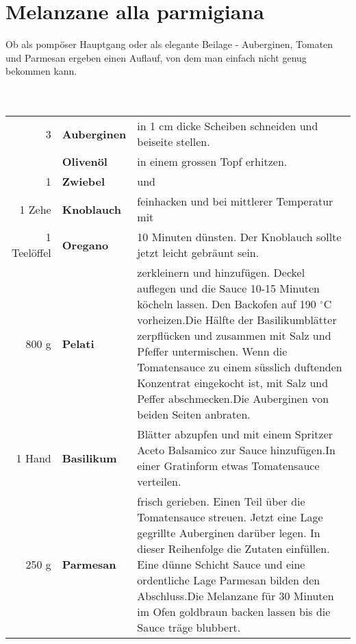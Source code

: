 

\section{Melanzane alla parmigiana}
Ob als pompöser Hauptgang oder als elegante Beilage - Auberginen, Tomaten und Parmesan ergeben einen Auflauf, von dem man einfach nicht genug bekommen kann.
\\
\\
\\
\begin{tabularx}{\linewidth}{r>{\bfseries\textbf}lX}
	3 & Auberginen & in 1 cm dicke Scheiben schneiden und beiseite stellen.\\
	& Olivenöl & in einem grossen Topf erhitzen.\\
	1 & Zwiebel & und\\
	1 Zehe & Knoblauch & feinhacken und bei mittlerer Temperatur mit\\
	1 Teelöffel & Oregano & 10 Minuten dünsten. Der Knoblauch sollte jetzt leicht gebräunt sein.\\
	800 g & Pelati & zerkleinern und hinzufügen. Deckel auflegen und die Sauce 10-15 Minuten köcheln lassen. Den Backofen auf 190 $^{\circ}$C vorheizen.\newline \newline Die Hälfte der Basilikumblätter zerpflücken und zusammen mit Salz und Pfeffer untermischen. Wenn die Tomatensauce zu einem süsslich duftenden Konzentrat eingekocht ist, mit Salz und Peffer abschmecken.\newline \newline Die Auberginen von beiden Seiten anbraten.\\
	1 Hand & Basilikum & Blätter abzupfen und mit einem Spritzer Aceto Balsamico zur Sauce hinzufügen.\newline \newline In einer Gratinform etwas Tomatensauce verteilen.\\
	250 g & Parmesan & frisch gerieben. Einen Teil über die Tomatensauce streuen. Jetzt eine Lage gegrillte Auberginen darüber legen. In dieser Reihenfolge die Zutaten einfüllen. Eine dünne Schicht Sauce und eine ordentliche Lage Parmesan bilden den Abschluss.\newline \newline Die Melanzane für 30 Minuten im Ofen goldbraun backen lassen bis die Sauce träge blubbert.\\
\end{tabularx}
